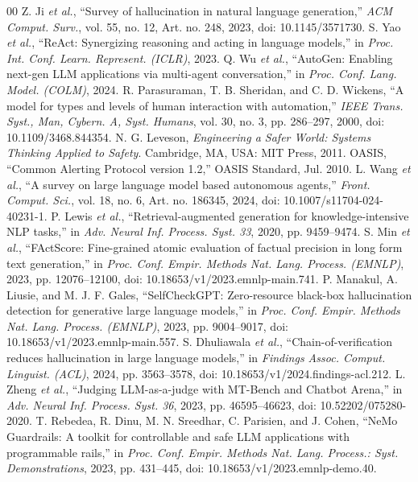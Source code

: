 \documentclass[conference]{IEEEtran}
\begin{document}
\balance
\begin{thebibliography}{00}
 Z. Ji \textit{et al.}, ``Survey of hallucination in natural language generation,'' \textit{ACM Comput. Surv.}, vol. 55, no. 12, Art. no. 248, 2023, doi: 10.1145/3571730.
 S. Yao \textit{et al.}, ``ReAct: Synergizing reasoning and acting in language models,'' in \textit{Proc. Int. Conf. Learn. Represent. (ICLR)}, 2023.
 Q. Wu \textit{et al.}, ``AutoGen: Enabling next-gen LLM applications via multi-agent conversation,'' in \textit{Proc. Conf. Lang. Model. (COLM)}, 2024.
 R. Parasuraman, T. B. Sheridan, and C. D. Wickens, ``A model for types and levels of human interaction with automation,'' \textit{IEEE Trans. Syst., Man, Cybern. A, Syst. Humans}, vol. 30, no. 3, pp. 286--297, 2000, doi: 10.1109/3468.844354.
 N. G. Leveson, \textit{Engineering a Safer World: Systems Thinking Applied to Safety}. Cambridge, MA, USA: MIT Press, 2011.
 OASIS, ``Common Alerting Protocol version 1.2,'' OASIS Standard, Jul. 2010.
 L. Wang \textit{et al.}, ``A survey on large language model based autonomous agents,'' \textit{Front. Comput. Sci.}, vol. 18, no. 6, Art. no. 186345, 2024, doi: 10.1007/s11704-024-40231-1.
 P. Lewis \textit{et al.}, ``Retrieval-augmented generation for knowledge-intensive NLP tasks,'' in \textit{Adv. Neural Inf. Process. Syst. 33}, 2020, pp. 9459--9474.
 S. Min \textit{et al.}, ``FActScore: Fine-grained atomic evaluation of factual precision in long form text generation,'' in \textit{Proc. Conf. Empir. Methods Nat. Lang. Process. (EMNLP)}, 2023, pp. 12076--12100, doi: 10.18653/v1/2023.emnlp-main.741.
 P. Manakul, A. Liusie, and M. J. F. Gales, ``SelfCheckGPT: Zero-resource black-box hallucination detection for generative large language models,'' in \textit{Proc. Conf. Empir. Methods Nat. Lang. Process. (EMNLP)}, 2023, pp. 9004--9017, doi: 10.18653/v1/2023.emnlp-main.557.
 S. Dhuliawala \textit{et al.}, ``Chain-of-verification reduces hallucination in large language models,'' in \textit{Findings Assoc. Comput. Linguist. (ACL)}, 2024, pp. 3563--3578, doi: 10.18653/v1/2024.findings-acl.212.
 L. Zheng \textit{et al.}, ``Judging LLM-as-a-judge with MT-Bench and Chatbot Arena,'' in \textit{Adv. Neural Inf. Process. Syst. 36}, 2023, pp. 46595--46623, doi: 10.52202/075280-2020.
 T. Rebedea, R. Dinu, M. N. Sreedhar, C. Parisien, and J. Cohen, ``NeMo Guardrails: A toolkit for controllable and safe LLM applications with programmable rails,'' in \textit{Proc. Conf. Empir. Methods Nat. Lang. Process.: Syst. Demonstrations}, 2023, pp. 431--445, doi: 10.18653/v1/2023.emnlp-demo.40.

\end{thebibliography}
\end{document}
